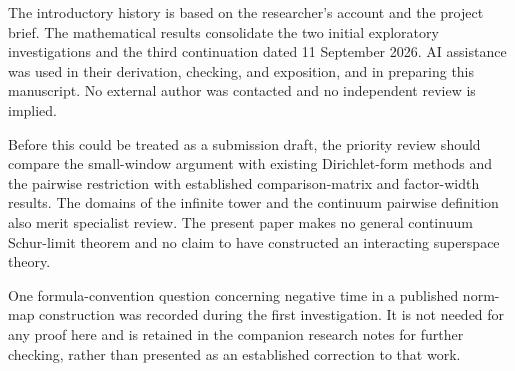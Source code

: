 \documentclass[11pt]{article}
\numberwithin{equation}{section}
\theoremstyle{definition}
\theoremstyle{remark}
\begin{document}
The introductory history is based on the researcher's account and the
project brief. The mathematical results consolidate the two initial exploratory
investigations and the third continuation dated 11 September 2026. AI assistance was used in their derivation,
checking, and exposition, and in preparing this manuscript. No external
author was contacted and no independent review is implied.

Before this could be treated as a submission draft, the priority review
should compare the small-window argument with existing Dirichlet-form
methods and the pairwise restriction with established comparison-matrix
and factor-width results. The domains of the infinite tower and the
continuum pairwise definition also merit specialist review. The present
paper makes no general continuum Schur-limit theorem and no claim to
have constructed an interacting superspace theory.

One formula-convention question concerning negative time in a published
norm-map construction was recorded during the first investigation.
It is not needed for any proof here and is retained in the companion
research notes for further checking, rather than presented as an
established correction to that work.
\end{document}
